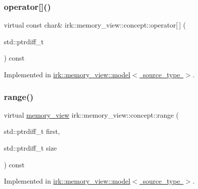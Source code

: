 \subsubsection{\texorpdfstring{operator[]()}{operator[]()}}
{\footnotesize\ttfamily virtual const char\& irk\+::memory\+\_\+view\+::concept\+::operator\mbox{[}$\,$\mbox{]} (\begin{DoxyParamCaption}\item[{std\+::ptrdiff\+\_\+t}]{ }\end{DoxyParamCaption}) const\hspace{0.3cm}{\ttfamily [pure virtual]}}



Implemented in \mbox{\hyperlink{classirk_1_1memory__view_1_1model_a8c54be09ffb8bd159e375d14a6f8218b}{irk\+::memory\+\_\+view\+::model$<$ source\+\_\+type $>$}}.

\mbox{\label{structirk_1_1memory__view_1_1concept_a9abcd2995563487390e941cf502b322c}} 
\subsubsection{\texorpdfstring{range()}{range()}}
{\footnotesize\ttfamily virtual \mbox{\hyperlink{classirk_1_1memory__view}{memory\+\_\+view}} irk\+::memory\+\_\+view\+::concept\+::range (\begin{DoxyParamCaption}\item[{std\+::ptrdiff\+\_\+t}]{first,  }\item[{std\+::ptrdiff\+\_\+t}]{size }\end{DoxyParamCaption}) const\hspace{0.3cm}{\ttfamily [pure virtual]}}



Implemented in \mbox{\hyperlink{classirk_1_1memory__view_1_1model_aed67f637a1f0e7e31dcf039074861724}{irk\+::memory\+\_\+view\+::model$<$ source\+\_\+type $>$}}.

\mbox{\label{structirk_1_1memory__view_1_1concept_ae280e124e776a61562f6a97b2fa7d655}} 
